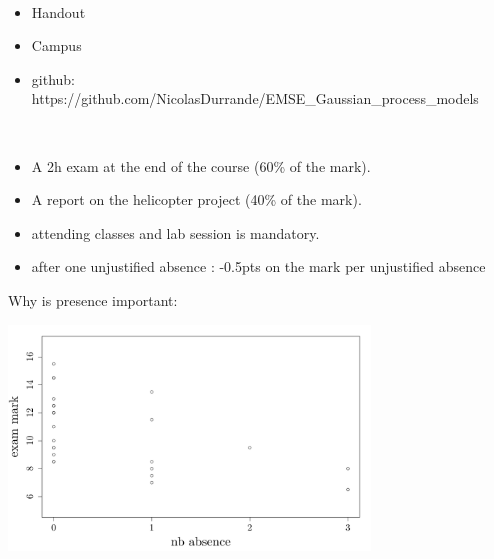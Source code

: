 \documentclass{beamer}
\begin{document}
\begin{frame}{}

\vspace{0.5cm}
\\
\begin{itemize}
	\item Handout
	\item Campus
	\item github: https://github.com/NicolasDurrande/EMSE_Gaussian_process_models
\end{itemize}

\vspace{0.5cm}
\\
\begin{itemize}
	\item A 2h exam at the end of the course (60\% of the mark).
	\item A report on the helicopter project (40\% of the mark).
\end{itemize}

\vspace{5mm}
\begin{itemize}
	\item attending classes and lab session is mandatory.
	\item after one unjustified absence : -0.5pts on the mark per unjustified absence
\end{itemize}
\end{frame}

\begin{frame}{}
Why is presence important:
\begin{center}
  \includegraphics[height=6cm]{figures/notes_vs_abs.pdf}
\end{center}
\end{frame}
\end{document}
